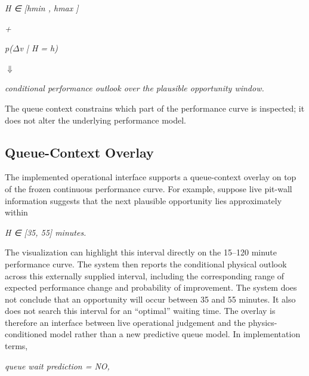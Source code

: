 \begin{center}\textit{H ∈ [hmin , hmax ]}\end{center}

\begin{center}\textit{+}\end{center}

\begin{center}\textit{p(\ensuremath{\Delta}v | H = h)}\end{center}

\begin{center}\textit{\ensuremath{\Downarrow}}\end{center}

\begin{center}\textit{conditional performance outlook over the plausible opportunity window.}\end{center}

The queue context constrains which part of the performance curve is inspected; it does not alter the underlying performance model.

\subsection{Queue-Context Overlay}
The implemented operational interface supports a queue-context overlay on top of the frozen continuous performance curve. For example, suppose live pit-wall information suggests that the next plausible opportunity lies approximately within

\begin{center}\textit{H ∈ [35, 55] minutes.}\end{center}

The visualization can highlight this interval directly on the 15--120 minute performance curve. The system then reports the conditional physical outlook across this externally supplied interval, including the corresponding range of expected performance change and probability of improvement. The system does not conclude that an opportunity will occur between 35 and 55 minutes. It also does not search this interval for an ``optimal'' waiting time. The overlay is therefore an interface between live operational judgement and the physics-conditioned model rather than a new predictive queue model. In implementation terms,

\begin{center}\textit{queue wait prediction = NO,}\end{center}

